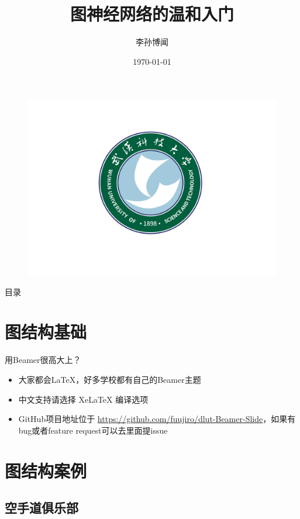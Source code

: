 \documentclass{beamer}
\author[Sunbowen Lee]{李孙博闻}
\title[Graph neural network]{图神经网络的温和入门}
\institute{武汉科技大学 \\ 理学院 \\ 冶金工业过程系统科学湖北省重点实验室}
\date{\today}
\begin{document}
\kaishu
\begin{frame}
    \titlepage
    \begin{figure}[htpb]
        \centering
        \vspace{-0.7cm}
        \includegraphics[width=0.45\linewidth]{pic/wust.png}
    \end{figure}
\end{frame}

\begin{frame}{目录}
        \tableofcontents[sectionstyle=show,subsectionstyle=hide]
\end{frame}


\section{图结构基础}

\begin{frame}{用Beamer很高大上？}
    \begin{itemize} %
        \item 大家都会\LaTeX{}，好多学校都有自己的Beamer主题
        \item 中文支持请选择 Xe\LaTeX{} 编译选项
        \item GitHub项目地址位于 \url{https://github.com/fuujiro/dlut-Beamer-Slide}，如果有bug或者feature request可以去里面提issue
    \end{itemize}
\end{frame}


\section{图结构案例}

\subsection{空手道俱乐部}
\end{document}
